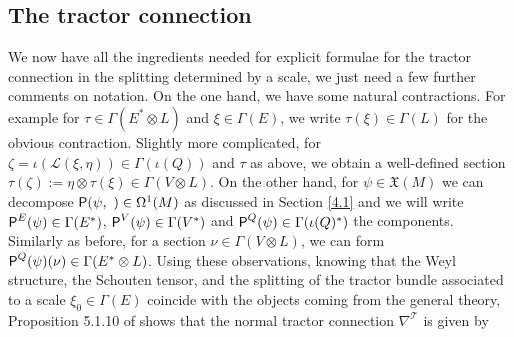 \documentclass[11pt]{amsart}
\def\Rho{\mbox{\textsf{P}}}
\numberwithin{proposition}{section}
\numberwithin{equation}{section}
\begin{document}
\subsection{The tractor connection}\label{4.5}
We now have all the ingredients needed for explicit formulae for the tractor connection in the splitting determined by a scale, we just need a few further comments on notation. On the one hand, we have some natural contractions. For example for $\tau\in\Gamma(E^*\otimes L)$ and $\xi\in\Gamma(E)$, we write $\tau(\xi)\in\Gamma(L)$ for the obvious contraction. Slightly more complicated, for $\zeta=\iota(\mathcal L(\xi,\eta))\in\Gamma(\iota(Q))$ and $\tau$ as above, we obtain a well-defined section $\tau(\zeta):=\eta\otimes\tau(\xi)\in\Gamma(V\otimes L)$. On the other hand, for $\psi\in\mathfrak X(M)$ we can decompose $\Rho(\psi,\ )\in\Omega^1(M)$ as discussed in Section \ref{4.1} and we will write $\Rho^E(\psi)\in\Gamma(E^*)$, $\Rho^V(\psi)\in\Gamma(V^*)$ and $\Rho^Q(\psi)\in\Gamma(\iota(Q)^*)$ the components. Similarly as before, for a section $\nu\in\Gamma(V\otimes L)$, we can form $\Rho^Q(\psi)(\nu)\in\Gamma(E^*\otimes L)$. Using these observations, knowing that the Weyl structure, the Schouten tensor, and the splitting of the tractor bundle associated to a scale $\xi_0\in\Gamma(E)$ coincide with the objects coming from the general theory, Proposition 5.1.10 of \cite{Book} shows that the normal tractor connection $\nabla^{\mathcal T}$ is given by 
\end{document}
